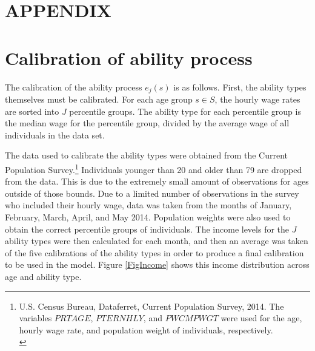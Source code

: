 \documentclass[letterpaper,12pt]{article}
\theoremstyle{definition}
\begin{document}
\section*{APPENDIX}                              %

\section{Calibration of ability process}\label{AppAbilCalib}

  The calibration of the ability process $e_j(s)$ is as follows.  First, the ability types themselves must be calibrated. For each age group $s \in S$, the hourly wage rates are sorted into $J$ percentile groups.  The ability type for each percentile group is the median wage for the percentile group, divided by the average wage of all individuals in the data set.

  The data used to calibrate the ability types were obtained from the Current Population Survey.\footnote{U.S. Census Bureau, Dataferret, Current Population Survey, 2014. The variables $PRTAGE$, $PTERNHLY$, and $PWCMPWGT$ were used for the age, hourly wage rate, and population weight of individuals, respectively. \\ [-2pt]} Individuals younger than 20 and older than 79 are dropped from the data. This is due to the extremely small amount of observations for ages outside of those bounds. Due to a limited number of observations in the survey who included their hourly wage, data was taken from the months of January, February, March, April, and May 2014.  Population weights were also used to obtain the correct percentile groups of individuals.  The income levels for the $J$ ability types were then calculated for each month, and then an average was taken of the five calibrations of the ability types in order to produce a final calibration to be used in the model. Figure \ref{FigIncome} shows this income distribution across age and ability type.
\end{document}

